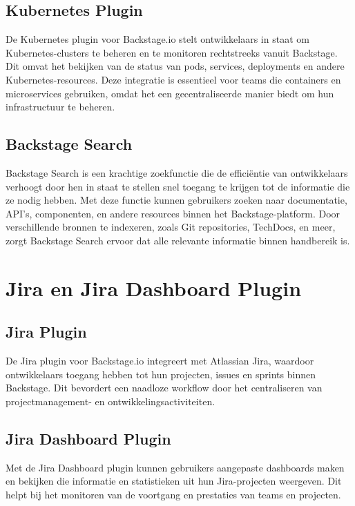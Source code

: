 \subsection{Kubernetes Plugin}

De Kubernetes plugin voor Backstage.io stelt ontwikkelaars in staat om Kubernetes-clusters te beheren en te monitoren rechtstreeks vanuit Backstage. Dit omvat het bekijken van de status van pods, services, deployments en andere Kubernetes-resources. Deze integratie is essentieel voor teams die containers en microservices gebruiken, omdat het een gecentraliseerde manier biedt om hun infrastructuur te beheren.

\subsection{Backstage Search}

Backstage Search is een krachtige zoekfunctie die de efficiëntie van ontwikkelaars verhoogt door hen in staat te stellen snel toegang te krijgen tot de informatie die ze nodig hebben. Met deze functie kunnen gebruikers zoeken naar documentatie, API's, componenten, en andere resources binnen het Backstage-platform. Door verschillende bronnen te indexeren, zoals Git repositories, TechDocs, en meer, zorgt Backstage Search ervoor dat alle relevante informatie binnen handbereik is.

\section{Jira en Jira Dashboard Plugin}

\subsection{Jira Plugin}

De Jira plugin voor Backstage.io integreert met Atlassian Jira, waardoor ontwikkelaars toegang hebben tot hun projecten, issues en sprints binnen Backstage. Dit bevordert een naadloze workflow door het centraliseren van projectmanagement- en ontwikkelingsactiviteiten.

\subsection{Jira Dashboard Plugin}

Met de Jira Dashboard plugin kunnen gebruikers aangepaste dashboards maken en bekijken die informatie en statistieken uit hun Jira-projecten weergeven. Dit helpt bij het monitoren van de voortgang en prestaties van teams en projecten.

